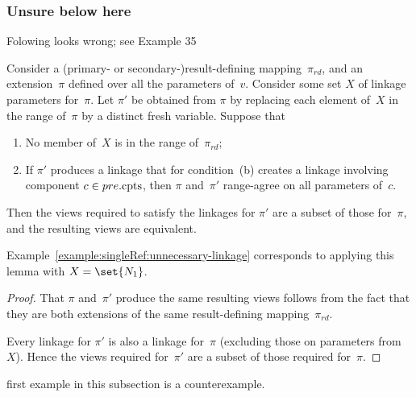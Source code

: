 





\subsubsection{Unsure below here}

\framebox{***} Folowing looks wrong; see Example 35

\begin{lemma}
\label{lem:necessary-renamings}
Consider a (primary- or secondary-)result-defining mapping~$\pi_{rd}$, and an
extension~$\pi$ defined over all the parameters of~$v$.  Consider some set $X$
of linkage parameters for~$\pi$.  Let $\pi'$ be obtained from $\pi$ by
replacing each element of~$X$ in the range of~$\pi$ by a distinct fresh
variable.  Suppose that
%
\begin{enumerate}
\item No member of~$X$  is in the range of~$\pi_{rd}$;

\item If $\pi'$ produces a linkage that for condition~(b) creates a linkage
  involving component $c \in pre.\mathrm{cpts}$, then $\pi$ and~$\pi'$ range-agree on
  all parameters of~$c$.
\end{enumerate}
%
Then the views required to satisfy the linkages for $\pi'$ are a subset of
those for~$\pi$, and the resulting views are equivalent.
\end{lemma}


Example~\ref{example:singleRef:unnecessary-linkage} corresponds to applying
this lemma with $X = \set{N_1}$. 


\begin{proof}
That $\pi$ and~$\pi'$ produce the same resulting views follows from the fact
that they are both extensions of the same result-defining mapping~$\pi_{rd}$. 

Every linkage for $\pi'$ is also a linkage for~$\pi$ (excluding those on
parameters from~$X$).  Hence the views required for~$\pi'$ are a subset of
those required for~$\pi$. 
\end{proof}

  first example in this subsection is a counterexample. 



